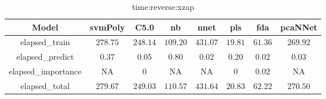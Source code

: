 \begin{table}[!ht]
	\centering
	\begin{tabular}{|c|c|c|c|c|c|c|c|}
		\hline
		Model & svmPoly & C5.0 & nb & nnet & pls & fda & pcaNNet \\ \hline
		elapsed_train & $278.75$ & $248.14$ & $109.20$ & $431.07$ & $19.81$ & $61.36$ & $269.92$ \\ \hline
		elapsed_predict & $0.37$ & $0.05$ & $0.80$ & $0.02$ & $0.20$ & $0.02$ & $0.03$ \\ \hline
		elapsed_importance & NA & $0$ & NA & NA & $0$ & $0.02$ & NA \\ \hline
		elapsed_total & $279.67$ & $249.03$ & $110.57$ & $431.64$ & $20.83$ & $62.22$ & $270.50$ \\ \hline
	\end{tabular}
	\caption{time:reverse:xzap}
	\label{tab:time:reverse:xzap}
\end{table}
